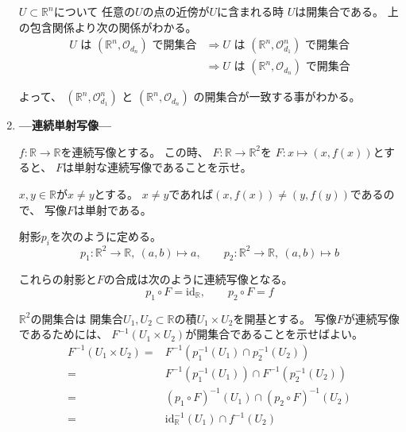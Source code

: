 \documentclass[12pt,b5paper]{ltjsarticle}
\begin{document}
\begin{enumerate}
      $U\subset\mathbb{R}^n$について
      任意の$U$の点の近傍が$U$に含まれる時
      $U$は開集合である。
      上の包含関係より次の関係がわかる。
      \begin{align}
       U \text{ は } (\mathbb{R}^n,\mathcal{O}_{d_{n}}) \text{ で開集合}
       & \Rightarrow
        U \text{ は } (\mathbb{R}^n,\mathcal{O}_{d_{1}}^n) \text{ で開集合}\\
       & \Rightarrow
       U \text{ は } (\mathbb{R}^n,\mathcal{O}_{d_{n}}) \text{ で開集合}
      \end{align}

      よって、
      $(\mathbb{R}^n,\mathcal{O}_{d_{1}}^n)$
      と
      $ (\mathbb{R}^n,\mathcal{O}_{d_{n}})$
      の開集合が一致する事がわかる。

      \hrulefill

 \item
      \textbf{---連続単射写像---}

      $f:\mathbb{R}\to\mathbb{R}$を連続写像とする。
      この時、
      $F:\mathbb{R}\to\mathbb{R}^2$を
      $F:x\mapsto (x,f(x))$とすると、
      $F$は単射な連続写像であることを示せ。

      \dotfill

      $x,y\in\mathbb{R}$が$x\ne y$とする。
      $x\ne y$であれば$(x,f(x))\ne (y,f(y))$であるので、
      写像$F$は単射である。

      射影$p_i$を次のように定める。
      \begin{equation}
       p_{1}:\mathbb{R}^2\to\mathbb{R}, \ (a,b)\mapsto a
        ,\qquad
       p_{2}:\mathbb{R}^2\to\mathbb{R}, \ (a,b)\mapsto b
      \end{equation}

      これらの射影と$F$の合成は次のように連続写像となる。
      \begin{equation}
       p_{1}\circ F =\mathrm{id}_{\mathbb{R}}
        ,\qquad
        p_{2}\circ F = f
      \end{equation}

      $\mathbb{R}^2$の開集合は
      開集合$U_1,U_2\subset\mathbb{R}$の積$U_1\times U_2$を開基とする。
      写像$F$が連続写像であるためには、
      $F^{-1}(U_1\times U_2)$が開集合であることを示せばよい。
      \begin{align}
       F^{-1}(U_1\times U_2)
        =& F^{-1}(p_{1}^{-1}(U_1)\cap p_{2}^{-1}(U_2))\\
        =& F^{-1}(p_{1}^{-1}(U_1))\cap F^{-1}(p_{2}^{-1}(U_2))\\
        =& (p_{1}\circ F)^{-1}(U_1)\cap (p_{2}\circ F)^{-1}(U_2)\\
        =& \mathrm{id}_{\mathbb{R}}^{-1}(U_1)\cap f^{-1}(U_2)
      \end{align}


\end{enumerate}
\end{document}
